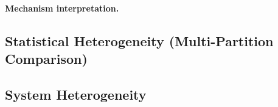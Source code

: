 \documentclass[11pt,a4paper]{report}  %
\newif\ifshowtodo
\newcommand{\TODOhpc}[1]{%
  \ifshowtodo\textcolor{red}{\textbf{[HPC PENDING: #1]}}\else#1\fi}
\begin{document}
\paragraph{Mechanism interpretation.}


\subsection{Statistical Heterogeneity (Multi-Partition Comparison)}
\label{sec:stat-het-multi}







\subsection{System Heterogeneity}
\label{sec:sys-het}
\end{document}
